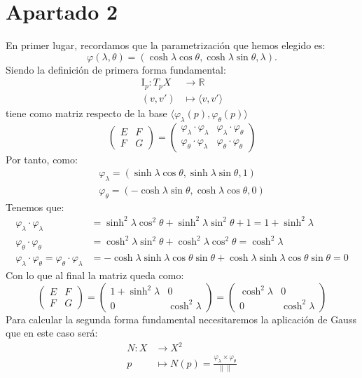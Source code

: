 \section{Apartado 2}
En primer lugar, recordamos que la parametrización que hemos elegido es:
\[
\varphi\left( \lambda, \theta \right) = \left( \cosh \lambda \cos \theta,
\cosh \lambda \sin \theta, \lambda \right).
\]
Siendo la definición de primera forma fundamental:
\begin{align*}
    \mathrm{I}_p: T_pX &\rightarrow \mathbb{R}\\
    \left( v, v' \right) &\mapsto \langle v, v' \rangle
\end{align*}
tiene como matriz respecto de la base $\langle \varphi_{\lambda}\left( p \right),
\varphi_{\theta}\left( p \right) \rangle$
\[
    \begin{pmatrix} E & F\\ F & G \end{pmatrix} = \begin{pmatrix} 
    \varphi_{\lambda} \cdot \varphi_{\lambda} & \varphi_{\lambda} \cdot \varphi_{\theta}\\
    \varphi_{\theta} \cdot \varphi_{\lambda} & \varphi_{\theta} \cdot
    \varphi_{\theta}
    \end{pmatrix}
\]
Por tanto, como:
\begin{gather*}
    \varphi_{\lambda} = \left( \sinh \lambda \cos \theta, \sinh \lambda \sin
    \theta, 1 \right)\\
    \varphi_{\theta} = \left( -\cosh \lambda \sin \theta, \cosh \lambda \cos
    \theta, 0 \right)
\end{gather*}
Tenemos que:
\begin{align*}
    \varphi_{\lambda} \cdot \varphi_{\lambda} &= \sinh^2 \lambda \cos^2 \theta +
    \sinh^2 \lambda \sin^2 \theta + 1 = 1 + \sinh^2 \lambda\\
    \varphi_{\theta} \cdot \varphi_{\theta} &= \cosh^2 \lambda \sin^2 \theta +
    \cosh^2 \lambda \cos^2 \theta = \cosh^2 \lambda\\
    \varphi_{\lambda} \cdot \varphi_{\theta} = \varphi_{\theta} \cdot
    \varphi_{\lambda} &= -\cosh \lambda \sinh \lambda \cos \theta \sin \theta +
    \cosh \lambda \sinh \lambda \cos \theta \sin \theta = 0
\end{align*}
Con lo que al final la matriz queda como:
\[
    \begin{pmatrix} E & F\\ F & G \end{pmatrix} = \begin{pmatrix} 
    1 + \sinh^2 \lambda & 0\\
    0 & \cosh^2 \lambda
    \end{pmatrix} = \begin{pmatrix} 
    \cosh^2 \lambda & 0\\
    0 & \cosh^2 \lambda
    \end{pmatrix}
\]
Para calcular la segunda forma fundamental necesitaremos la aplicación de Gauss
que en este caso será:
\begin{align*}
    N : X &\rightarrow X^2\\
    p &\mapsto N\left( p \right) = \frac{\varphi_{\lambda} \times
    \varphi_{\theta}}{\left\lVert  \right\rVert}
\end{align*}
